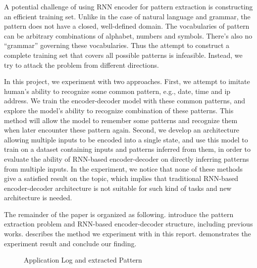 \documentclass{article}
\begin{document}
A potential challenge of using RNN encoder for pattern extraction is constructing an efficient training set. Unlike in the case of natural language and grammar, the pattern does not have a closed, well-defined domain. The vocabularies of pattern can be arbitrary combinations of alphabet, numbers and symbols. There's also no ``grammar'' governing these vocabularies. Thus the attempt to construct a complete training set that covers all possible patterns is infeasible. Instead, we try to attack the problem from different directions.

In this project, we experiment with two approaches. First, we attempt to imitate human's ability to recognize some common pattern, e.g., date, time and ip address. We train the encoder-decoder model with these common patterns, and explore the model's ability to recognize combination of these patterns. This method will allow the model to remember some patterns and recognize them when later encounter these pattern again. Second, we develop an architecture allowing multiple inputs to be encoded into a single state, and use this model to train on a dataset containing inputs and patterns inferred from them, in order to evaluate the ability of RNN-based encoder-decoder on directly inferring patterns from multiple inputs. In the experiment, we notice that none of these methods give a satisfied result on the topic, which implies that traditional RNN-based encoder-decoder architecture is not suitable for such kind of tasks and new architecture is needed. 

The remainder of the paper is organized as following.  introduce the pattern extraction problem and RNN-based encoder-decoder structure, including previous works.  describes the method we experiment with in this report.  demonstrates the experiment result and  conclude our finding.

\begin{figure}
\centering
{}
\caption{Application Log and extracted Pattern}
\label{fig:pattern}
\end{figure}
\end{document}
